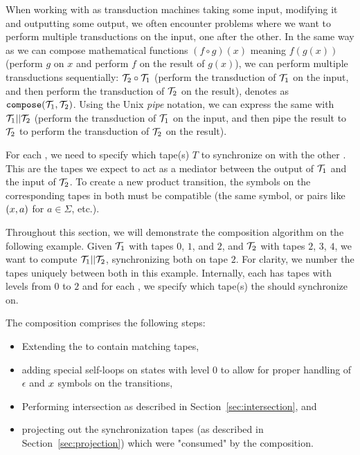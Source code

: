 When working with \nfts as transduction machines taking some input, modifying it and outputting some output, we often encounter problems where we want to perform multiple transductions on the input, one after the other.
In the same way as we can compose mathematical functions $(f \circ g)(x)$ meaning $f(g(x))$ (perform $g$ on $x$ and perform $f$ on the result of $g(x)$),
we can perform multiple \nfts transductions sequentially: $\mathcal{T}_2 \circ \mathcal{T}_1$
(perform the transduction of $\mathcal{T}_1$ on the input, and then perform the transduction of $\mathcal{T}_2$ on the result), denotes as $\texttt{compose}(\mathcal{T}_1, \mathcal{T}_2)$.
Using the Unix \emph{pipe} notation, we can express the same with $\mathcal{T}_1 || \mathcal{T}_2$
(perform the transduction of $\mathcal{T}_1$ on the input, and then pipe the result to $\mathcal{T}_2$ to perform the transduction of $\mathcal{T}_2$ on the result).

For each \nft, we need to specify which tape(s) $T$ to synchronize on with the other \nft.
This are the tapes we expect to act as a mediator between the output of $\mathcal{T}_1$ and the input of $\mathcal{T}_2$.
To create a new product transition, the symbols on the corresponding tapes in both \nfts must be compatible (the same symbol, or pairs like $(x, a)$ for $a \in \Sigma$, etc.).

\begin{example}
  Throughout this section, we will demonstrate the composition algorithm on the following example.
  Given \nft $\mathcal{T}_1$ with tapes $0$, $1$, and $2$, and $\mathcal{T}_2$ with tapes $2$, $3$, $4$, we want to compute $\mathcal{T}_1 || \mathcal{T}_2$, synchronizing both \nfts on tape $2$.
  For clarity, we number the tapes uniquely between both \nfts in this example. Internally, each \nft has tapes with levels from $0$ to $2$ and for each \nft, we specify which tape(s) the \nfts should synchronize on.
\end{example}

The composition comprises the following steps:
\begin{itemize}
  \item Extending the \nfts to contain matching tapes,
  \item adding special self-loops on states with level $0$ to allow for proper handling of $\epsilon$ and $x$ symbols on the transitions,
  \item Performing \nft intersection as described in Section~\ref{sec:intersection}, and
  \item projecting out the synchronization tapes (as described in Section~\ref{sec:projection}) which were "consumed" by the composition.
\end{itemize}

